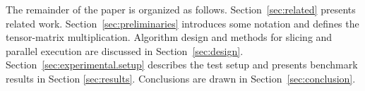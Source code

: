 The remainder of the paper is organized as follows. 
Section~\ref{sec:related} presents related work.
Section~\ref{sec:preliminaries} introduces some notation and defines the tensor-matrix multiplication.
Algorithm design and methods for slicing and parallel execution are discussed in Section~\ref{sec:design}.
Section~\ref{sec:experimental.setup} describes the test setup and presents benchmark results in Section \ref{sec:results}.
Conclusions are drawn in Section~\ref{sec:conclusion}.